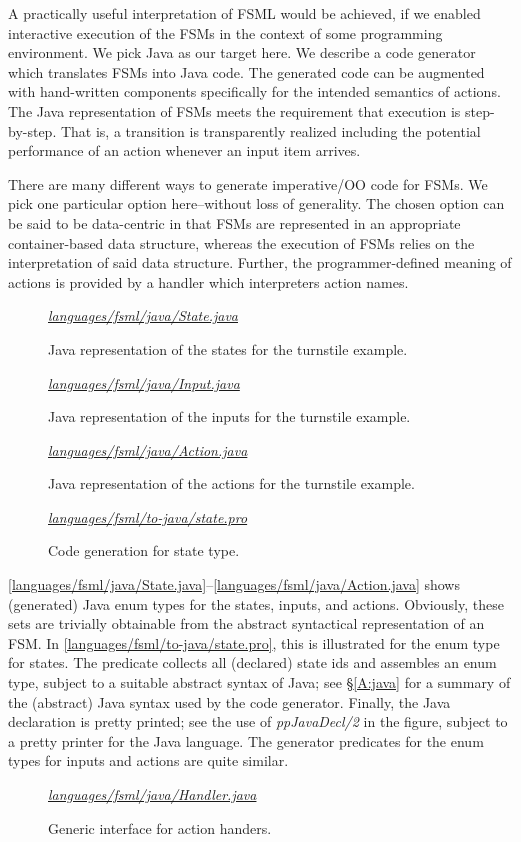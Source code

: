 \documentclass[preprint,authoryear,12pt]{noelsarticle}
\newcommand{\codefigure}[3]{
\begin{figure}[t!]
\begin{boxedminipage}{\hsize}
\mbox{}\hfill{}{\small\textit{\href{http://github.com/slebok/slepro/tree/master/#2}{#2}}}

\end{boxedminipage}
\caption{#1.}
\label{#2}
\medskip
\end{figure}}
\begin{document}
A practically useful interpretation of FSML would be achieved, if we
enabled interactive execution of the FSMs in the context of some
programming environment. We pick Java as our target here. We describe
a code generator which translates FSMs into Java code. The generated
code can be augmented with hand-written components specifically for
the intended semantics of actions. The Java representation of FSMs
meets the requirement that execution is step-by-step. That is, a
transition is transparently realized including the potential
performance of an action whenever an input item arrives.

There are many different ways to generate imperative/OO code for
FSMs. We pick one particular option here--without loss of
generality. The chosen option can be said to be data-centric in that
FSMs are represented in an appropriate container-based data structure,
whereas the execution of FSMs relies on the interpretation of said
data structure. Further, the programmer-defined meaning of actions is
provided by a handler which interpreters action names.

\codefigure{%
Java representation of the states for the turnstile example}{%
languages/fsml/java/State.java}{%
java}

\codefigure{%
Java representation of the inputs for the turnstile example}{%
languages/fsml/java/Input.java}{%
java}

\codefigure{%
Java representation of the actions for the turnstile example}{%
languages/fsml/java/Action.java}{%
java}

\codefigure{%
Code generation for state type}{%
languages/fsml/to-java/state.pro}{%
prolog}

\autoref{languages/fsml/java/State.java}--\autoref{languages/fsml/java/Action.java}
shows (generated) Java enum types for the states, inputs, and
actions. Obviously, these sets are trivially obtainable from the
abstract syntactical representation of an FSM. In
\autoref{languages/fsml/to-java/state.pro}, this is illustrated for
the enum type for states. The predicate collects all (declared) state
ids and assembles an enum type, subject to a suitable abstract syntax
of Java; see \S\ref{A:java} for a summary of the (abstract) Java
syntax used by the code generator. Finally, the Java declaration is
pretty printed; see the use of \emph{ppJavaDecl/2} in the figure,
subject to a pretty printer for the Java language. The generator
predicates for the enum types for inputs and actions are quite
similar.

\codefigure{%
Generic interface for action handers}{%
languages/fsml/java/Handler.java}{%
java}
\end{document}
